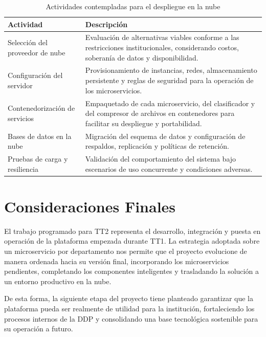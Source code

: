 \begin{table}[H]
\centering
\caption{Actividades contempladas para el despliegue en la nube}
\label{tab:despliegue_nube}
\renewcommand{\arraystretch}{1.4}
\begin{tabularx}{\textwidth}{|p{5.5cm}|X|}
\hline
\textbf{Actividad} & \textbf{Descripción} \\
\hline

Selección del proveedor de nube &
Evaluación de alternativas viables conforme a las restricciones institucionales, considerando costos, soberanía de datos y disponibilidad. \\
\hline

Configuración del servidor &
Provisionamiento de instancias, redes, almacenamiento persistente y reglas de seguridad para la operación de los microservicios. \\
\hline

Contenedorización de servicios &
Empaquetado de cada microservicio, del clasificador y del compresor de archivos en contenedores para facilitar su despliegue y portabilidad. \\
\hline

Bases de datos en la nube &
Migración del esquema de datos y configuración de respaldos, replicación y políticas de retención. \\
\hline

Pruebas de carga y resiliencia &
Validación del comportamiento del sistema bajo escenarios de uso concurrente y condiciones adversas. \\
\hline

\end{tabularx}
\end{table}

\section{Consideraciones Finales}

El trabajo programado para TT2 representa el desarrollo, integración y puesta en operación de la plataforma empezada durante TT1. La estrategia adoptada sobre un microservicio por departamento nos permite que el proyecto evolucione de manera ordenada hacia su versión final, incorporando los microservicios pendientes, completando los componentes inteligentes y trasladando la solución a un entorno productivo en la nube.

De esta forma, la siguiente etapa del proyecto tiene planteado garantizar que la plataforma pueda ser realmente de utilidad para la institución, fortaleciendo los procesos internos de la DDP y consolidando una base tecnológica sostenible para su operación a futuro.
